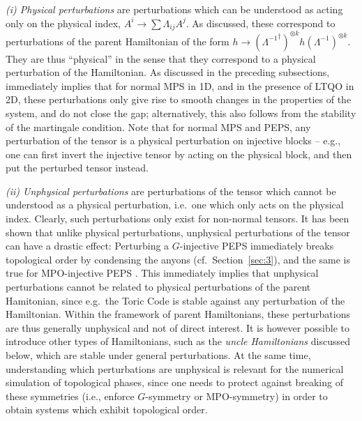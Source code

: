 \documentclass[rmp,aps,reprint,superscriptaddress,nobalancelastpage]{revtex4-1}
\begin{document}
    \emph{(i) Physical perturbations} are perturbations which can be understood as acting only on the physical index, $A^i\to \sum\Lambda_{ij} A^j$. As discussed, these correspond to perturbations of the parent Hamiltonian of the form
$h\to({\Lambda^{-1}}^\dagger)^{\otimes k}h(\Lambda^{-1})^{\otimes k}$. They are thus ``physical'' in the sense that they correspond to a physical perturbation of the Hamiltonian. As discussed in the preceding subsections, immediately implies that for normal MPS in 1D, and in the presence of LTQO in 2D, these perturbations only give rise to smooth changes in the properties of the system, and do not close the gap; alternatively, this also follows from the stability of the martingale condition.  Note that for normal MPS and PEPS, any perturbation of the tensor is a physical perturbation on injective blocks -- e.g., one can first invert the injective tensor by acting on the physical block, and then put the perturbed tensor instead.

    \emph{(ii) Unphysical perturbations} are perturbations of the tensor which cannot be understood as a physical perturbation, i.e.\ one which only acts on the physical index. Clearly, such perturbations only exist for non-normal tensors. It has been shown that unlike physical perturbations, unphysical perturbations of the tensor can have a drastic effect: Perturbing a $G$-injective PEPS immediately breaks topological order \cite{chen:topo-symmetry-conditions} by condensing the anyons (cf.~Section~\ref{sec:3}), and the same is true for MPO-injective PEPS \cite[][though MPO-injective PEPS are stable against certain unphysical perturbations]{shukla:tns-stringnet-pert-condensation}. This immediately implies that unphysical perturbations cannot be related to physical perturbations of the parent Hamitonian, since e.g.\ the Toric Code is stable against any perturbation of the Hamiltonian.  Within the framework of parent Hamiltonians, these perturbations are thus generally unphysical and not of direct interest.  It is however possible to introduce other types of Hamiltonians, such as the \emph{uncle Hamiltonians} discussed below, which are stable under general perturbations. At the same time, understanding which perturbations are unphysical is relevant for the numerical simulation of topological phases, since one needs to protect against breaking of these symmetries (i.e., enforce $G$-symmetry or MPO-symmetry) in order to obtain systems which exhibit topological order.
\end{document}

